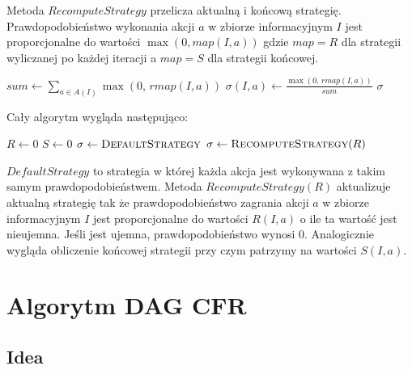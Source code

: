 \documentclass[licencjacka]{pracamgr}
\begin{document}
$\,$ \\
Metoda $RecomputeStrategy$ przelicza aktualną i końcową strategię. Prawdopodobieństwo wykonania akcji $a$
w zbiorze informacyjnym $I$ jest proporcjonalne do wartości $\max(0, map(I, a))$ gdzie $map=R$ dla strategii
wyliczanej po każdej iteracji a $map=S$ dla strategii końcowej.

\begin{algorithmic}
            \State $sum \gets \sum\limits_{a \in A(I)} \max(0, \, rmap(I, a))$
                \State $\sigma(I, a) \gets \frac{\max(0, \, rmap(I, a))}{sum}$
            \EndFor
        \EndFor
        \State \Return $\sigma$
    \EndFunction
\end{algorithmic}

$\,$ \\
\noindent
Cały algorytm wygląda następująco: \\

\begin{algorithmic}
        \State $R \gets 0$
        \State $S \gets 0$
        \State $\sigma \gets \Call{DefaultStrategy}{}$
            \State {}
            \State $\sigma \gets \Call{RecomputeStrategy}{R}$
        \EndFor
        \State \Return {}
    \EndFunction
\end{algorithmic}

$\,$ \\
\noindent
$DefaultStrategy$ to strategia w której każda akcja jest wykonywana z takim samym prawdopodobieństwem. Metoda
$RecomputeStrategy(R)$ aktualizuje aktualną strategię tak że prawdopodobieństwo zagrania akcji $a$ w zbiorze informacyjnym
$I$ jest proporcjonalne do wartości $R(I, a)$ o ile ta wartość jest nieujemna. Jeśli jest ujemna, prawdopodobieństwo
wynosi $0$. Analogicznie wygląda obliczenie końcowej strategii przy czym patrzymy na wartości $S(I, a)$.

\chapter{Algorytm DAG CFR}

\section{Idea}
\end{document}
